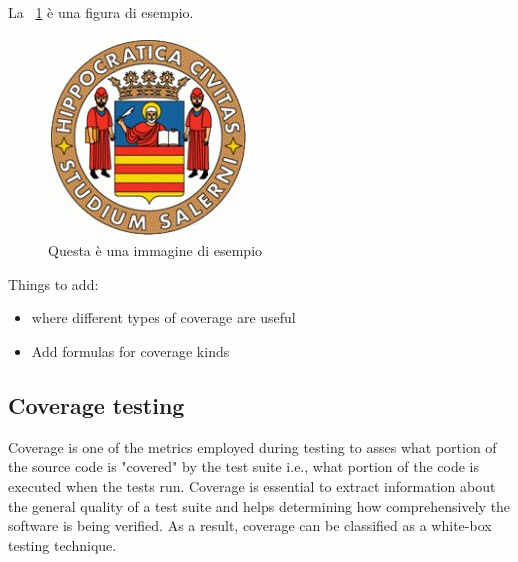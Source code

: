 La \figurename~\ref{fig:esempio} è una figura di esempio.

\begin{figure}[htbp]
    \centering
    \includegraphics[scale=0.7]{./figures/logo_standard.jpg}
    \caption{Questa è una immagine di esempio}
    \label{fig:esempio}
\end{figure}


Things to add:
\begin{itemize}
    \item where different types of coverage are useful
    \item Add formulas for coverage kinds
\end{itemize}


\subsection*{Coverage testing}
Coverage is one of the metrics employed during testing to asses what portion of the source code is "covered" by the test suite i.e., 
what portion of the code is executed when the tests run. Coverage is essential to extract information about the general quality of a test suite
and helps determining how comprehensively the software is being verified.
As a result, coverage can be classified as a white-box testing technique.


